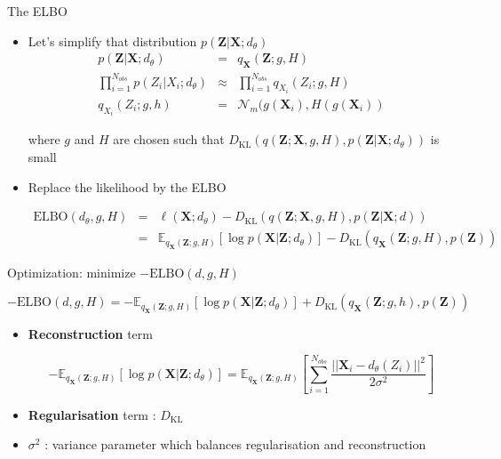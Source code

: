 \documentclass[compress,10pt]{beamer}
\begin{document}
\begin{frame}{The ELBO}

\begin{itemize}

\item

Let's simplify that distribution 
$p(\mathbf{Z}  | \mathbf{X};d_{\theta})$ 
\begin{eqnarray*}
 p(\mathbf{Z}  | \mathbf{X};d_{\theta}) &=& q_{\mathbf{X}}(\mathbf{Z};g,H)\\
 \prod_{i=1}^{N_{obs}} p(Z_i |  X_i; d_{\theta}) &\approx&     \prod_{i=1}^{N_{obs}} q_{ X_i}(Z_i;g,H)\\
 q_{X_i}(Z_i;g,h) &=&\mathcal{N}_m(g(\textbf{X}_i),H(g(\textbf{X}_i))
 \end{eqnarray*}
 
 where $g$ and $H$ are chosen such that 
$D_\text{KL}(q(\mathbf{Z};\mathbf{X},g,H), p(\mathbf{Z} |\mathbf{X};d_\theta))$ is small

\item
  Replace the likelihood by the ELBO


\begin{eqnarray*}
\text{ELBO}(d_{\theta},g,H) &=&\ell(\mathbf{X}; d_{\theta})-  D_\text{KL}(q(\mathbf{Z};\mathbf{X},g,H), p(\mathbf{Z} |\mathbf{X};d))\\
&=& \mathbb{E}_{q_{\mathbf{X}}(\mathbf{Z};g,H)}[\log p(\mathbf{X} | \mathbf{Z};d_{\theta})]- D_\text{KL}(q_{\mathbf{X}}(\mathbf{Z};g,H), p(\mathbf{Z}))
\end{eqnarray*}

\end{itemize}

\end{frame}
\begin{frame}{Optimization: minimize $-\text{ELBO}(d,g,H) $ }
 


\[-\text{ELBO}(d,g,H)  =-  \mathbb{E}_{q_{\mathbf{X}}(\mathbf{Z};g,H)}[\log p(\mathbf{X} | \mathbf{Z};d_\theta)] +  D_\text{KL}(q_{\mathbf{X}}(\mathbf{Z};g,h), p(\mathbf{Z}))\]

\begin{itemize}
\item \textbf{Reconstruction} term 

$$-\mathbb{E}_{q_{\mathbf{X}}(\mathbf{Z};g,H)}[\log p(\mathbf{X} | \mathbf{Z};d_\theta)] = \mathbb{E}_{q_{\mathbf{X}}(\mathbf{Z};g,H)}  \left[\sum_{i=1}^{N_{obs}}   \frac{||\mathbf{X}_i - d_\theta(Z_i)||^2}{2\sigma^2}\right]$$ 

\item \textbf{Regularisation} term :  $D_\text{KL}$
  
\item  $\sigma^2$ : variance parameter which balances regularisation and  reconstruction
\end{itemize}
\end{frame}
\end{document}
